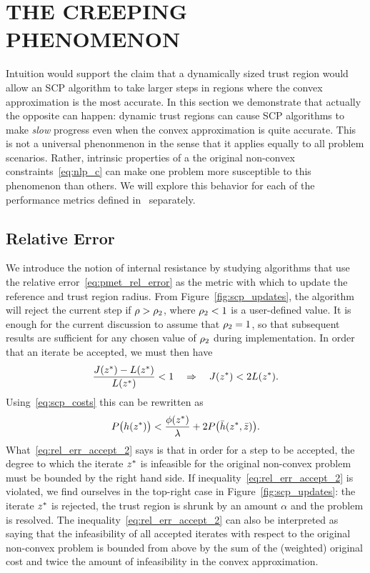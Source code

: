 \documentclass[letterpaper, 10 pt, conference]{ieeeconf}
\begin{document}
\section{THE CREEPING PHENOMENON}

Intuition would support the claim that a dynamically sized trust region would allow an SCP algorithm to take larger steps in regions where the convex approximation is the most accurate. In this section we demonstrate that actually the opposite can happen: dynamic trust regions can cause SCP algorithms to make \textit{slow} progress even when the convex approximation is quite accurate. This is not a universal phenonmenon in the sense that it applies equally to all problem scenarios. Rather, intrinsic properties of a the original non-convex constraints~\eqref{eq:nlp_c} can make one problem more susceptible to this phenomenon than others. We will explore this behavior for each of the performance metrics defined in~ separately.

\subsection{Relative Error}\label{subsec:creep_rel_err}

We introduce the notion of internal resistance by studying algorithms that use the relative error~\eqref{eq:pmet_rel_error} as the metric with which to update the reference and trust region radius. From Figure~\ref{fig:scp_updates}, the algorithm will reject the current step if $\rho>\rho_2$, where $\rho_2<1$ is a user-defined value. It is enough for the current discussion to assume that $\rho_2=1$, so that subsequent results are sufficient for any chosen value of $\rho_2$ during implementation. In order that an iterate be accepted, we must then have
\begin{equation}
\frac{J(z^*) - L(z^*)}{L(z^*)} < 1 \quad \Rightarrow \quad  J(z^*) < 2 L(z^*).
\label{eq:rel_err_accept}
\end{equation} 
Using~\eqref{eq:scp_costs} this can be rewritten as
\begin{equation}
P\big( h(z^*) \big) < \frac{\phi(z^*)}{\lambda} + 2 P\big( \bar{h}(z^*,\bar{z}) \big).
\label{eq:rel_err_accept_2}
\end{equation}
What~\eqref{eq:rel_err_accept_2} says is that in order for a step to be accepted, the degree to which the iterate $z^*$ is infeasible for the original non-convex problem must be bounded by the right hand side. If inequality~\eqref{eq:rel_err_accept_2} is violated, we find ourselves in the top-right case in Figure~\ref{fig:scp_updates}: the iterate $z^*$ is rejected, the trust region is shrunk by an amount $\alpha$ and the problem is resolved. The inequality~\eqref{eq:rel_err_accept_2} can also be interpreted as saying that the infeasibility of all accepted iterates with respect to the original non-convex problem is bounded from above by the sum of the (weighted) original cost and twice the amount of infeasibility in the convex approximation. 
\end{document}
